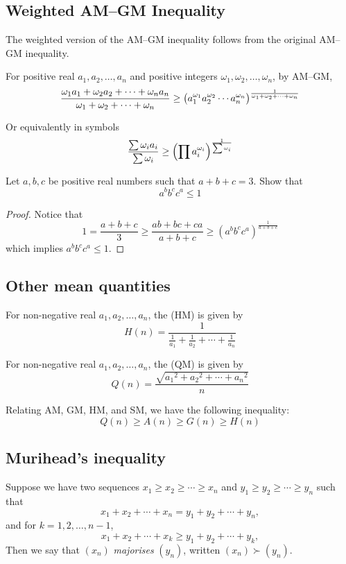 \subsection{Weighted AM--GM Inequality}
The weighted version of the AM--GM inequality follows from the original AM--GM inequality. 
\begin{theorem}
For positive real $a_1,a_2,\dots,a_n$ and positive integers $\omega_1,\omega_2,\dots,\omega_n$, by AM--GM,
\begin{equation}
\frac{\omega_1a_1+\omega_2a_2+\cdots+\omega_na_n}{\omega_1+\omega_2+\cdots+\omega_n} \ge \left(a_1^{\omega_1}a_2^{\omega_2}\cdots a_n^{\omega_n}\right)^\frac{1}{\omega_1+\omega_2+\cdots+\omega_n}
\end{equation}
\end{theorem}

Or equivalently in symbols
\[ \frac{\sum\omega_ia_i}{\sum\omega_i} \ge \left(\prod a_i^{\omega_i}\right)^\frac{1}{\sum\omega_i} \]

\begin{exercise}
Let $a, b, c$ be positive real numbers such that $a+b+c=3$. Show that
\[ a^bb^cc^a \le 1 \]
\end{exercise}
\begin{proof}
Notice that
\[ 1=\frac{a+b+c}{3} \ge \frac{ab+bc+ca}{a+b+c} \ge (a^bb^cc^a)^\frac{1}{a+b+c} \]
which implies $a^bb^cc^a \le 1$.
\end{proof}

\subsection{Other mean quantities}
For non-negative real $a_1,a_2,\dots,a_n$, the  (HM) is given by
\[ H(n)=\frac{1}{\frac{1}{a_1}+\frac{1}{a_2}+\cdots+\frac{1}{a_n}} \]

For non-negative real $a_1,a_2,\dots,a_n$, the  (QM) is given by
\[ Q(n)=\frac{\sqrt{{a_1}^2+{a_2}^2+\cdots+{a_n}^2}}{n} \]

Relating AM, GM, HM, and SM, we have the following inequality:
\[ Q(n) \ge A(n) \ge G(n) \ge H(n) \]

\subsection{Murihead's inequality}
Suppose we have two sequences $x_1\ge x_2\ge\cdots\ge x_n$ and $y_1\ge y_2\ge\cdots\ge y_n$ such that
\[ x_1+x_2+\cdots+x_n=y_1+y_2+\cdots+y_n, \]
and for $k=1,2,\dots,n-1$,
\[ x_1+x_2+\cdots+x_k\ge y_1+y_2+\cdots+y_k, \]
Then we say that $(x_n)$ \emph{majorises} $(y_n)$, written $(x_n)\succ(y_n)$.

